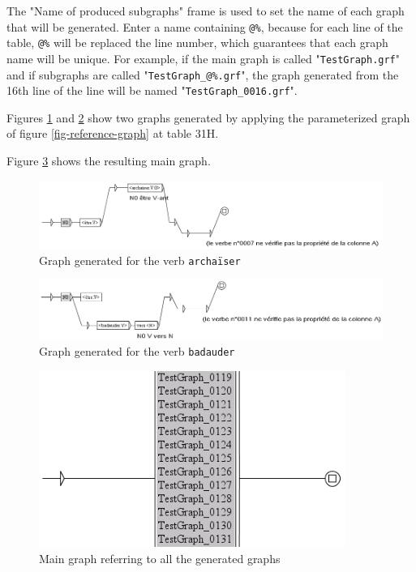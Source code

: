 \bigskip
\noindent The "Name of produced subgraphs" frame is used to set the name of each
graph that will be generated. Enter a name containing \verb+@%+, because for each line of
the table, \verb+@%+ will be replaced the line number, which guarantees that each
graph name will be unique. For example, if the main graph is called
"\verb+TestGraph.grf+" and if subgraphs are called "\verb+TestGraph_@%.grf+", the
graph generated from the 16th line of the line will be named
"\verb+TestGraph_0016.grf+".

\bigskip
\noindent Figures \ref{fig-archaiser} and \ref{fig-badauder} show
two graphs generated by applying the parameterized graph of figure
\ref{fig-reference-graph} at table 31H.

\bigskip
\noindent Figure \ref{fig-main-graph} shows the resulting main graph.

\begin{figure}[!ht]
\begin{center}
\includegraphics[width=15cm]{resources/img/fig8-8.png}
\caption{Graph generated for the verb
\texttt{archa\"iser}\label{fig-archaiser}}
\end{center}
\end{figure}

\begin{figure}[!ht]
\begin{center}
\includegraphics[width=15cm]{resources/img/fig8-9.png}
\caption{Graph generated for the verb \texttt{badauder}\label{fig-badauder}}
\end{center}
\end{figure}

\begin{figure}[!ht]
\begin{center}
\includegraphics[width=10cm]{resources/img/fig8-10.png}
\caption{Main graph referring to all the generated
graphs\label{fig-main-graph}}
\end{center}
\end{figure}


